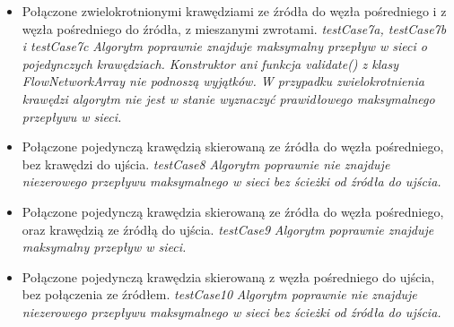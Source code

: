 \begin{itemize}[nosep]
    \item Połączone zwielokrotnionymi krawędziami ze źródła do węzła pośredniego
    i z węzła pośredniego do źródła, z mieszanymi zwrotami.
    \emph{testCase7a, testCase7b i testCase7c}
    \emph{Algorytm poprawnie
    znajduje maksymalny przepływ w sieci o pojedynczych krawędziach. Konstruktor
    ani funkcja validate() z klasy FlowNetworkArray nie podnoszą wyjątków.
    W przypadku zwielokrotnienia krawędzi algorytm nie jest w stanie wyznaczyć
    prawidłowego maksymalnego przepływu w sieci.}

    \item Połączone pojedynczą krawędzią skierowaną ze źródła do węzła
    pośredniego, bez krawędzi do ujścia.
    \emph{testCase8}
    \emph{Algorytm poprawnie nie znajduje niezerowego
    przepływu maksymalnego w sieci bez ścieżki od źródła do ujścia.}

    \item Połączone pojedynczą krawędzia skierowaną ze źródła do węzła
    pośredniego, oraz krawędzią ze źródłą do ujścia.
    \emph{testCase9}
    \emph{Algorytm poprawnie znajduje maksymalny
    przepływ w sieci.}

    \item Połączone pojedynczą krawędzia skierowaną z węzła pośredniego do
    ujścia, bez połączenia ze źródłem.
    \emph{testCase10}
    \emph{Algorytm poprawnie nie znajduje niezerowego
    przepływu maksymalnego w sieci bez ścieżki od źródła do ujścia.}
\end{itemize}


